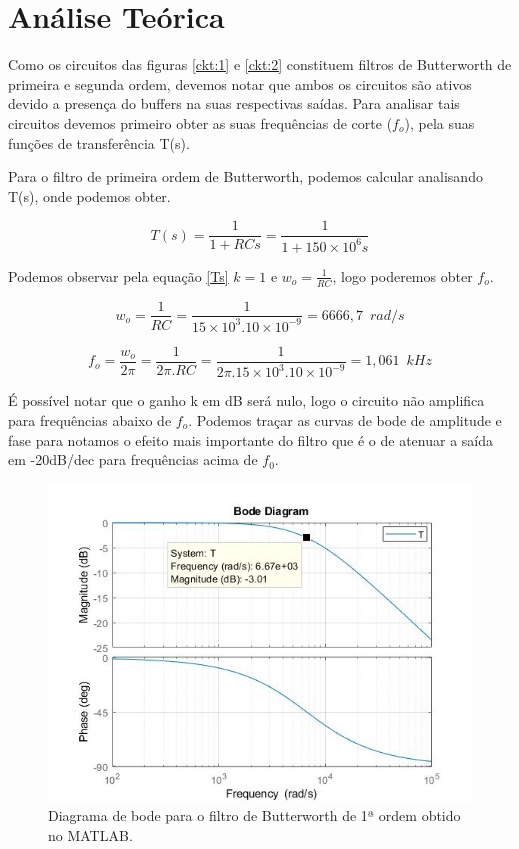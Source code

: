 \section{Análise Teórica}

Como os circuitos das figuras \ref{ckt:1} e \ref{ckt:2} constituem filtros de Butterworth de primeira e segunda ordem, devemos notar que ambos os circuitos são ativos devido a presença do buffers na suas respectivas saídas. Para analisar tais circuitos devemos primeiro obter as suas frequências de corte ($f_o$), pela suas funções de transferência T(s).

Para o filtro de primeira ordem de Butterworth, podemos calcular analisando T(s), onde podemos obter.


\begin{equation} \label{Ts}
T(s) = \frac{1}{1+RCs} = \frac{1}{1+150\times10^6s} 
\end{equation}

Podemos observar pela equação \ref{Ts} $k=1$ e  $w_o= \frac{1}{RC}$, logo poderemos obter $f_o$.

\begin{equation} \label{f1}
w_o = \frac{1}{RC} = \frac{1}{15\times 10^3 . 10 \times 10^{-9}}  = 6666,7 \hspace{6pt} rad/s
\end{equation}

\begin{equation} \label{f3}
f_o = \frac{w_o}{2\pi} = \frac{1}{2\pi  .RC} = \frac{1}{2\pi . 15\times 10^3 . 10 \times 10^{-9}} = 1,061 \hspace{6pt} kHz
\end{equation}


É possível notar que o ganho k em dB será nulo, logo o circuito não amplifica para frequências abaixo de $f_o$. Podemos traçar as curvas de bode de amplitude e fase para notamos o efeito mais importante do filtro que é o de atenuar a saída em -20dB/dec para frequências acima de $f_0$.

\begin{figure}[H] 
\centering
\includegraphics[width=12cm]{images/bode1ordem.jpg}
\caption{Diagrama de bode para o filtro de Butterworth de 1ª ordem obtido no MATLAB.}
\label{fig:20} 
\end{figure}

